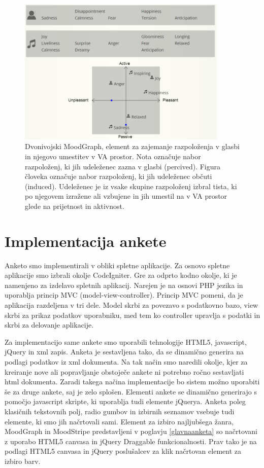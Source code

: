 \documentclass[a4paper, 12pt]{book}
\begin{document}
{\begin{figure}[htb]
\centering
\includegraphics[width=10cm]{images/moodgraphdvo.png}

\caption{Dvonivojski MoodGraph, element za zajemanje razpoloženja v glasbi in njegovo umestitev v VA prostor. Nota označuje nabor razpoloženj, ki jih udeleženec zazna v glasbi (percived). Figura človeka označuje nabor razpoloženj, ki jih udeleženec občuti (induced). Udeleženec je iz vsake skupine razpoloženj izbral tista, ki po njegovem izražene ali vzbujene in jih umestil na v VA prostor glede na prijetnost in aktivnost.}
\label{moodgraphdvo}
\end{figure}

\section{Implementacija ankete}

Anketo smo implementirali v obliki spletne aplikacije. Za osnovo spletne aplikacije smo izbrali okolje CodeIgniter. Gre za odprto kodno okolje, ki je namenjeno za izdelavo spletnih aplikacij. Narejen je na osnovi PHP jezika in uporablja princip MVC (model-view-controller). Princip MVC pomeni, da je aplikacija razdeljena v tri dele. Model skrbi za povezavo s podatkovno bazo, view skrbi za prikaz podatkov uporabniku, med tem ko controller upravlja s podatki in skrbi za delovanje aplikacije.

Za implementacijo same ankete smo uporabili tehnologije HTML5, javascript, jQuery in xml zapis. Anketa je sestavljena tako, da se dinamično generira na podlagi podatkov iz xml dokumenta. Na tak način smo naredili okolje, kjer za kreiranje nove ali popravljanje obstoječe ankete ni potrebno ročno sestavljati html dokumenta. Zaradi takega načina implementacije bo sistem možno uporabiti še za druge ankete, saj je zelo splošen. Elementi ankete se dinamično generirajo s pomočjo javascript skripte, ki uporablja tudi elemente jQuerya. Anketa poleg klasičnih tekstovnih polj, radio gumbov in izbirnih seznamov vsebuje tudi elemente, ki smo jih načrtovali sami. Element za izbiro najljubšega žanra, MoodGraph in MoodStripe predstavljeni v poglavju \ref{glavnaanketa} so načrtovani z uporabo HTML5 canvasa in jQuery Draggable funkcionalnosti. Prav tako je na podlagi HTML5 canvasa in jQuery poslušalcev za klik načrtovan element za izbiro barv. 

}
\end{document}
